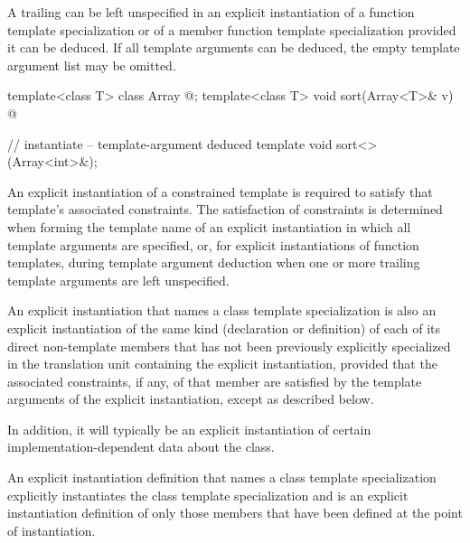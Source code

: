 \pnum
A trailing
can be left unspecified in an explicit instantiation of a function template
specialization or of a member function template specialization provided
it can be deduced.
If all template arguments can be deduced,
the empty template argument list \tcode{<>} may be omitted.
\begin{example}
\begin{codeblock}
template<class T> class Array { @\commentellip@ };
template<class T> void sort(Array<T>& v) { @\commentellip@ }

// instantiate  -- template-argument deduced
template void sort<>(Array<int>&);
\end{codeblock}
\end{example}

\pnum
\begin{note}
An explicit instantiation of a constrained template is required
to satisfy that template's associated constraints.
The satisfaction of constraints is determined
when forming the template name of an explicit instantiation
in which all template arguments are specified,
or, for explicit instantiations of function templates,
during template argument deduction
when one or more trailing template arguments are left unspecified.
\end{note}

\pnum
An explicit instantiation that names a class
template specialization is also an explicit
instantiation of the same kind (declaration or definition) of each
of its direct non-template members
that has not been previously explicitly specialized in
the translation unit containing the explicit instantiation,
provided that the associated constraints, if any,
of that member are satisfied by the template arguments of the explicit
instantiation,
except as described below.
\begin{note}
In addition, it will typically be an explicit instantiation of certain
%
implementation-dependent data about the class.
\end{note}

\pnum
An explicit instantiation definition that names a class template
specialization explicitly instantiates the class template specialization
and is an explicit instantiation definition of only those
members that have been defined at the point of instantiation.

